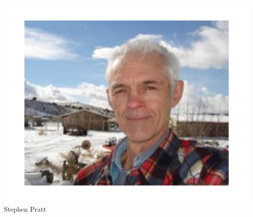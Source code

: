 \begin{frame}
    \centering
    \includegraphics[height=0.75\textheight]{img/stephen-pratt.png} \\
    Stephen Pratt \\
\end{frame}

